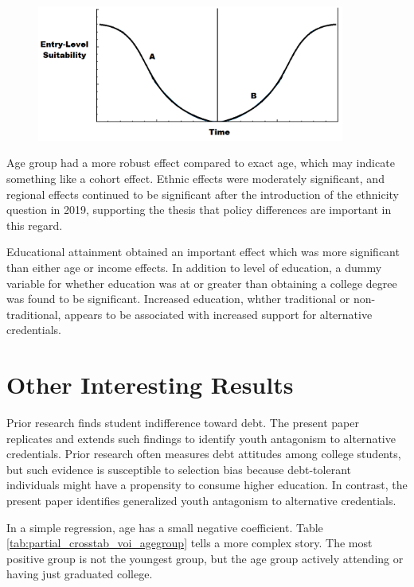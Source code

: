 \documentclass[AER]{./aea-latex-templates/AEA}
\begin{document}
\begin{figure}[h!]
    \centering
     \includegraphics[width=0.9\textwidth]{./figures-and-tables/figure-4.png}
    \label{fig:employer_driven_favorability}
    \end{figure}

Age group had a more robust effect compared to exact age, which may
indicate something like a cohort effect. Ethnic effects were moderately
significant, and regional effects continued to be significant after the
introduction of the ethnicity question in 2019, supporting the thesis
that policy differences are important in this regard.

Educational attainment obtained an important effect which was more
significant than either age or income effects. In addition to level of
education, a dummy variable for whether education was at or greater than
obtaining a college degree was found to be significant. Increased
education, whther traditional or non-traditional, appears to be
associated with increased support for alternative credentials.

\section{Other Interesting Results}

Prior research finds student indifference toward debt\cite{davies1995student}.
The present paper replicates and extends such
findings to identify youth antagonism to alternative credentials. Prior
research often measures debt attitudes among college students, but such
evidence is susceptible to selection bias because debt-tolerant
individuals might have a propensity to consume higher education. In
contrast, the present paper identifies generalized youth antagonism to
alternative credentials.

In a simple regression, age has a small negative coefficient.
Table \ref{tab:partial_crosstab_voi_agegroup} tells a more complex story.
The most positive group is not the youngest group, but the age group actively
attending or having just graduated college.
\end{document}
